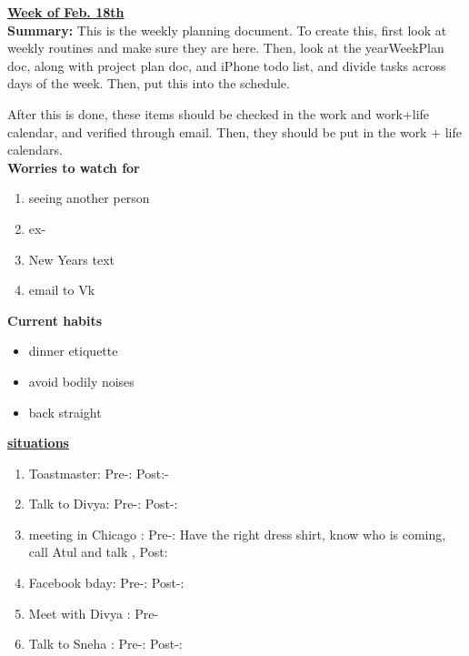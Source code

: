 \documentclass[11pt]{article}
\begin{document}
{\huge{\underline{\textbf{Week of Feb. 18th}}}} \\

\textbf{Summary:} This is the weekly planning document. To create
this, first look at weekly routines and make sure they are here. Then,
look at the yearWeekPlan doc, along with project plan doc, and iPhone
todo list, and divide tasks across days of the week. Then, put this
into the schedule.

After this is done, these items should be checked in the work and
work+life calendar, and verified through email.
Then, they should be put in the work + life
calendars. \\

\textbf{Worries to watch for} \\
\begin{enumerate}
\item seeing another person
\item ex-
\item New Years text
\item email to Vk

\end{enumerate}

\textbf{Current habits}\\
\begin{itemize}
\item dinner etiquette
\item avoid bodily noises
\item back straight
\end{itemize}

\underline{\textbf{situations}} \\
\begin{enumerate}
\item Toastmaster: Pre-:    Post:-
\item Talk to Divya: Pre-:  Post-:
\item meeting in Chicago : Pre-: Have the right dress shirt, know who is coming, call Atul and talk ,  Post:
\item Facebook bday:  Pre-:    Post-:
\item Meet with Divya :   Pre-
\item Talk to Sneha :  Pre-:     Post-:
\end{enumerate}
\end{document}
